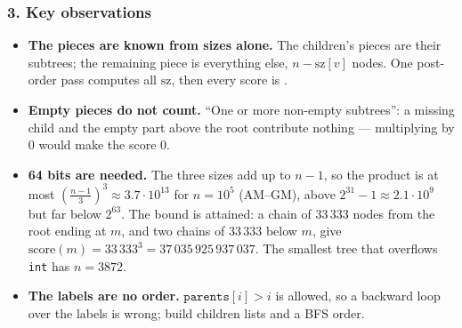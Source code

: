 \begin{diagrambox}
\end{diagrambox}

\subsubsection*{3. Key observations}

\begin{itemize}[leftmargin=*]
    \item \textbf{The pieces are known from sizes alone.} The children's pieces are their subtrees; the remaining piece is everything else, $n - \mathrm{sz}[v]$ nodes. One post-order pass computes all $\mathrm{sz}$, then every score is .
    \item \textbf{Empty pieces do not count.} ``One or more non-empty subtrees'': a missing child and the empty part above the root contribute nothing --- multiplying by $0$ would make the score 0.
    \item \textbf{64 bits are needed.} The three sizes add up to $n - 1$, so the product is at most $\left(\frac{n-1}{3}\right)^3 \approx 3.7\cdot10^{13}$ for $n = 10^5$ (AM--GM), above $2^{31} - 1 \approx 2.1\cdot10^9$ but far below $2^{63}$. The bound is attained: a chain of $33\,333$ nodes from the root ending at $m$, and two chains of $33\,333$ below $m$, give $\mathrm{score}(m) = 33\,333^3 = 37\,035\,925\,937\,037$. The smallest tree that overflows \texttt{int} has $n = 3872$.
    \item \textbf{The labels are no order.} $\texttt{parents}[i] > i$ is allowed, so a backward loop over the labels is wrong; build children lists and a BFS order.
\end{itemize}

